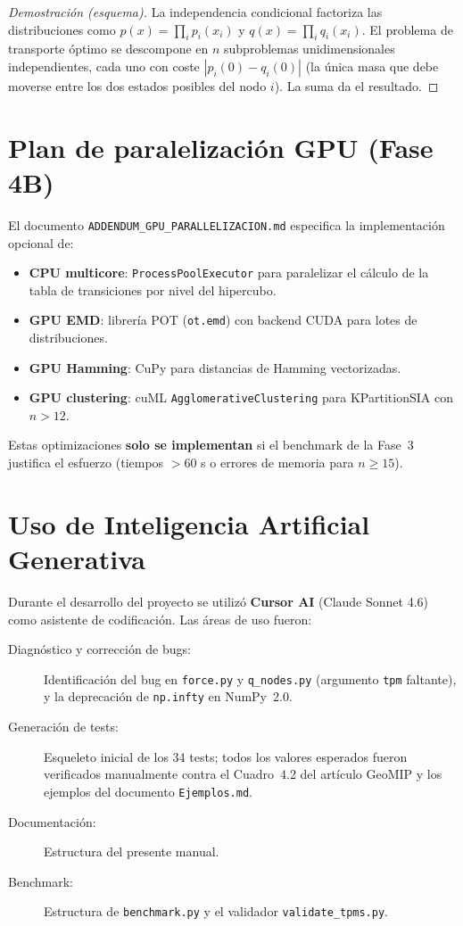 \documentclass[11pt,letterpaper]{article}
\begin{document}
\begin{proof}[Demostración (esquema)]
  La independencia condicional factoriza las distribuciones como
  $p(x) = \prod_i p_i(x_i)$ y $q(x) = \prod_i q_i(x_i)$.
  El problema de transporte óptimo se descompone en $n$ subproblemas
  unidimensionales independientes, cada uno con coste $|p_i(0) - q_i(0)|$
  (la única masa que debe moverse entre los dos estados posibles del nodo $i$).
  La suma da el resultado.
\end{proof}

\section{Plan de paralelización GPU (Fase 4B)}
\label{app:gpu}

El documento \texttt{ADDENDUM\_GPU\_PARALLELIZACION.md} especifica la
implementación opcional de:

\begin{itemize}
  \item \textbf{CPU multicore}: \texttt{ProcessPoolExecutor} para paralelizar
        el cálculo de la tabla de transiciones por nivel del hipercubo.
  \item \textbf{GPU EMD}: librería POT (\texttt{ot.emd}) con backend CUDA
        para lotes de distribuciones.
  \item \textbf{GPU Hamming}: CuPy para distancias de Hamming vectorizadas.
  \item \textbf{GPU clustering}: cuML \texttt{AgglomerativeClustering} para
        KPartitionSIA con $n > 12$.
\end{itemize}

Estas optimizaciones \textbf{solo se implementan} si el benchmark de la
Fase~3 justifica el esfuerzo (tiempos $> 60$ s o errores de memoria para
$n \ge 15$).

\section{Uso de Inteligencia Artificial Generativa}
\label{app:ia}

Durante el desarrollo del proyecto se utilizó \textbf{Cursor AI} (Claude
Sonnet 4.6) como asistente de codificación.  Las áreas de uso fueron:

\begin{description}
  \item[Diagnóstico y corrección de bugs:] Identificación del bug en
    \texttt{force.py} y \texttt{q\_nodes.py} (argumento \texttt{tpm}
    faltante), y la deprecación de \texttt{np.infty} en NumPy~2.0.
  \item[Generación de tests:] Esqueleto inicial de los 34 tests;
    todos los valores esperados fueron verificados manualmente contra
    el Cuadro~4.2 del artículo GeoMIP y los ejemplos del documento
    \texttt{Ejemplos.md}.
  \item[Documentación:] Estructura del presente manual.
  \item[Benchmark:] Estructura de \texttt{benchmark.py} y el validador
    \texttt{validate\_tpms.py}.
\end{description}
\end{document}
